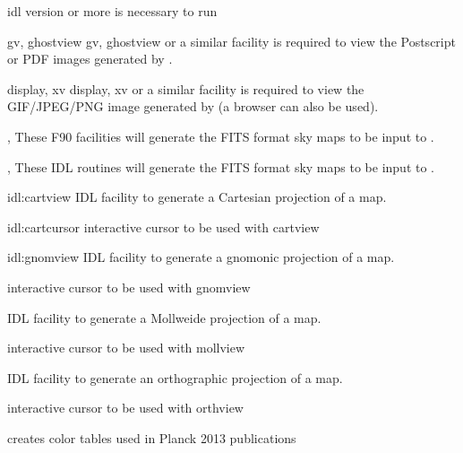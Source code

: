 \newpage
\begin{related}
  \begin{sulist}{} %
  \item[idl] version \idlversion or more is necessary to run \thedocid
  \item[gv, ghostview] gv, ghostview or a similar facility is required to view
	  the Postscript or PDF images generated by \thedocid.
  \item[display, xv] display, xv or a similar facility is required to view the
            GIF/JPEG/PNG image generated by \thedocid{} (a browser can also 
            be used).
  \item[\htmlref{synfast}{fac:synfast}, \htmlref{smoothing}{fac:smoothing}] These F90 \healpix facilities will generate the FITS format 
            sky maps to be input to \thedocid.
  \item[\htmlref{isynfast}{idl:isynfast}, \htmlref{ismoothing}{idl:ismoothing}] These IDL routines will generate the FITS format 
            sky maps to be input to \thedocid.
  \item[{\htmlref{cartview} {idl:cartview}}] 
	IDL facility to generate a Cartesian projection of
  	a \healpix map.
  \item[{\htmlref{cartcursor} {idl:cartcursor}}] 
	interactive cursor to be used with cartview
  \item[{\htmlref{gnomview} {idl:gnomview}}] 
	IDL facility to generate a gnomonic projection of
  	a \healpix map.
  \item[{\htmlref{gnomcursor}{idl:gnomcursor}}] 
	interactive cursor to be used with gnomview
  \item[{\htmlref{mollview}{idl:mollview}}] 
	IDL facility to generate a Mollweide projection of
  	a \healpix map.
  \item[{\htmlref{mollcursor}{idl:mollcursor}}] interactive cursor to be used with mollview
  \item[{\htmlref{orthview}{idl:orthview}}] 
	IDL facility to generate an orthographic projection of
  	a \healpix map.
  \item[{\htmlref{orthcursor}{idl:orthcursor}}] 
	interactive cursor to be used with orthview
  \item[{\htmlref{planck\_colors}{idl:planck_colors}}]
        creates color tables used in Planck 2013 publications
  \end{sulist}
\end{related}



